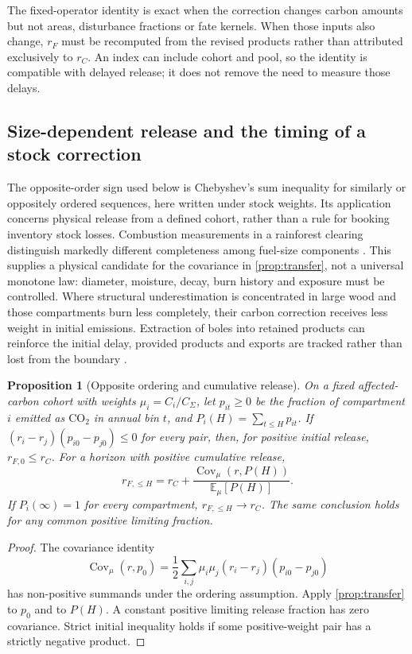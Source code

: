 \documentclass[11pt,a4paper]{article}
\newcommand{\COtwo}{\ensuremath{\mathrm{CO}_2}}
\newcommand{\E}{\mathbb{E}}
\DeclareMathOperator{\Cov}{Cov}
\newtheorem{proposition}{Proposition}[section]
\theoremstyle{remark}
\begin{document}
The fixed-operator identity is exact when the correction changes carbon amounts but not areas, disturbance fractions or fate kernels. When those inputs also change, $r_F$ must be recomputed from the revised products rather than attributed exclusively to $r_C$. An index can include cohort and pool, so the identity is compatible with delayed release; it does not remove the need to measure those delays.

\subsection{Size-dependent release and the timing of a stock correction}\label{sec:timing}
The opposite-order sign used below is Chebyshev's sum inequality for similarly or oppositely ordered sequences, here written under stock weights. Its application concerns physical release from a defined cohort, rather than a rule for booking inventory stock losses.
Combustion measurements in a rainforest clearing distinguish markedly different completeness among fuel-size components \citep{Carvalho1998}. This supplies a physical candidate for the covariance in \cref{prop:transfer}, not a universal monotone law: diameter, moisture, decay, burn history and exposure must be controlled. Where structural underestimation is concentrated in large wood and those compartments burn less completely, their carbon correction receives less weight in initial emissions. Extraction of boles into retained products can reinforce the initial delay, provided products and exports are tracked rather than lost from the boundary \citep{IPCC2006}.

\begin{proposition}[Opposite ordering and cumulative release]\label{prop:timing}
On a fixed affected-carbon cohort with weights $\mu_i=C_i/C_\Sigma$, let $p_{it}\geq0$ be the fraction of compartment $i$ emitted as \COtwo{} in annual bin $t$, and $P_i(H)=\sum_{t\leq H}p_{it}$. If $(r_i-r_j)(p_{i0}-p_{j0})\leq0$ for every pair, then, for positive initial release, $r_{F,0}\leq r_C$. For a horizon with positive cumulative release,
\begin{equation}
 r_{F,\leq H}=r_C+\frac{\Cov_\mu(r,P(H))}{\E_\mu[P(H)]}.
 \label{eq:timing}
\end{equation}
If $P_i(\infty)=1$ for every compartment, $r_{F,\leq H}\to r_C$. The same conclusion holds for any common positive limiting fraction.
\end{proposition}
\begin{proof}
The covariance identity
\begin{equation}
 \Cov_\mu(r,p_0)=\frac12\sum_{i,j}\mu_i\mu_j(r_i-r_j)(p_{i0}-p_{j0})
 \label{eq:pairwisecov}
\end{equation}
has non-positive summands under the ordering assumption. Apply \cref{prop:transfer} to $p_0$ and to $P(H)$. A constant positive limiting release fraction has zero covariance. Strict initial inequality holds if some positive-weight pair has a strictly negative product.
\end{proof}
\end{document}
